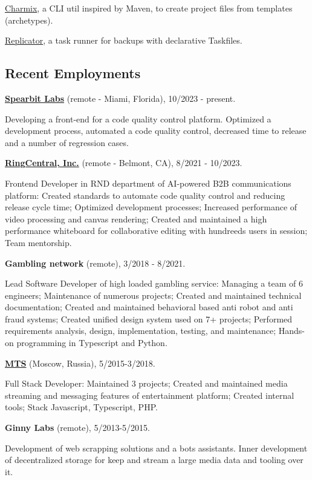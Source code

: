 \documentclass{vitonsky}
\begin{document}
\href{https://github.com/vitonsky/charmix}{Charmix}, a CLI util inspired
by Maven, to create project files from templates (archetypes).

\href{https://github.com/vitonsky/replicator}{Replicator}, a task runner
for backups with declarative Taskfiles.

\subsection*{Recent Employments}

\textbf{\href{https://spearbit.com/}{Spearbit Labs}} (remote -  Miami, Florida), 10/2023 - present.

Developing a front-end for a code quality control platform. Optimized a development process, automated a code quality control, decreased time to release and a number of regression cases.

\textbf{\href{https://www.ringcentral.com/}{RingCentral, Inc.}} (remote - Belmont, CA), 8/2021 - 10/2023.

Frontend Developer in RND department of AI-powered B2B communications platform: Created standards to automate code quality control and reducing release cycle time; Optimized development processes; Increased performance of video processing and canvas rendering; Created and maintained a high performance whiteboard for collaborative editing with hundreeds users in session; Team mentorship.

\textbf{Gambling network} (remote), 3/2018 - 8/2021.

Lead Software Developer of high loaded gambling service: Managing a team of 6 engineers; Maintenance of numerous projects; Created and maintained technical documentation; Created and maintained behavioral based anti robot and anti fraud systems; Created unified design system used on 7+ projects; Performed requirements analysis, design, implementation, testing, and maintenance; Hands-on programming in Typescript and Python.

\textbf{\href{https://mts.ru}{MTS}} (Moscow, Russia), 5/2015-3/2018.

Full Stack Developer: Maintained 3 projects; Created and maintained media streaming and messaging features of entertainment platform; Created internal tools; Stack Javascript, Typescript, PHP.

\textbf{Ginny Labs} (remote), 5/2013-5/2015.

Development of web scrapping solutions and a bots assistants. Inner development of decentralized storage for keep and stream a large media data and tooling over it.
\end{document}
